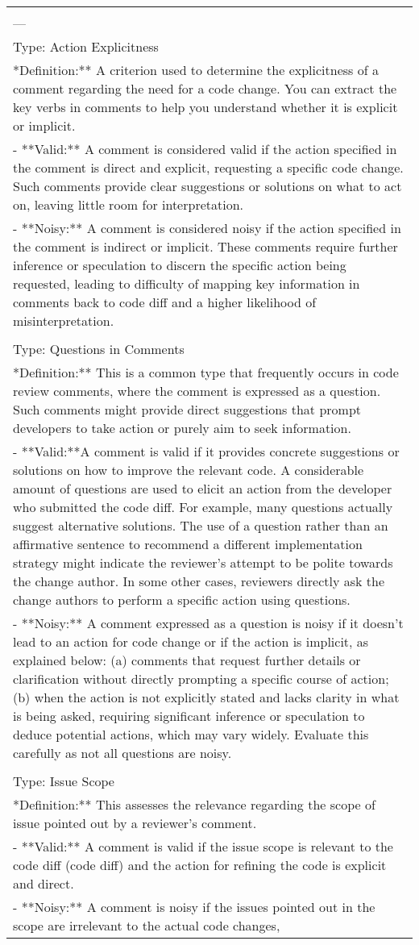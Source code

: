 \begin{table*}[!t]
\begin{tabular}{p{\textwidth}}
        \\\\---\\ Type: Action Explicitness\\**Definition:** A criterion used to determine the explicitness of a comment regarding the need for a code change. You can extract the key verbs in comments to help you understand whether it is explicit or implicit.\\- **Valid:** A comment is considered valid if the action specified in the comment is direct and explicit, requesting a specific code change. Such comments provide clear suggestions or solutions on what to act on, leaving little room for interpretation. \\- **Noisy:** A comment is considered noisy if the action specified in the comment is indirect or implicit. These comments require further inference or speculation to discern the specific action being requested, leading to difficulty of mapping key information in comments back to code diff and a higher likelihood of misinterpretation.\\\\ Type: Questions in Comments\\**Definition:** This is a common type that frequently occurs in code review comments, where the comment is expressed as a question. Such comments might provide direct suggestions that prompt developers to take action or purely aim to seek information.\\- **Valid:**A comment is valid if it provides concrete suggestions or solutions on how to improve the relevant code. A considerable amount of questions are used to elicit an action from the developer who submitted the code diff. For example, many questions actually suggest alternative solutions. The use of a question rather than an affirmative sentence to recommend a different implementation strategy might indicate the reviewer’s attempt to be polite towards the change author. In some other cases, reviewers directly ask the change authors to perform a specific action using questions.\\- **Noisy:**  A comment expressed as a question is noisy if it doesn't lead to an action for code change or if the action is implicit, as explained below: (a) comments that request further details or clarification without directly prompting a specific course of action; (b) when the action is not explicitly stated and lacks clarity in what is being asked, requiring significant inference or speculation to deduce potential actions, which may vary widely. Evaluate this carefully as not all questions are noisy.\\\\ Type: Issue Scope\\**Definition:** This assesses the relevance regarding the scope of issue pointed out by a reviewer's comment.\\- **Valid:** A comment is valid if the issue scope is relevant to the code diff (code diff) and the action for refining the code is explicit and direct. \\- **Noisy:** A comment is noisy if the issues pointed out in the scope are irrelevant to the actual code changes, 
\end{tabular}
\end{table*}
